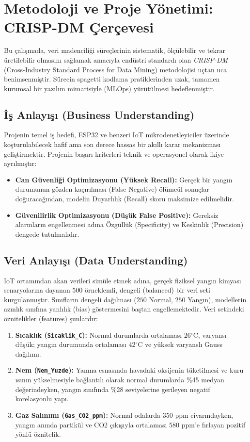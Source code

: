 \documentclass[12pt,a4paper]{article}
\begin{document}
\section{Metodoloji ve Proje Yönetimi: CRISP-DM Çerçevesi}
Bu çalışmada, veri madenciliği süreçlerinin sistematik, ölçülebilir ve tekrar üretilebilir olmasını sağlamak amacıyla endüstri standardı olan \textit{CRISP-DM} (Cross-Industry Standard Process for Data Mining) metodolojisi uçtan uca benimsenmiştir. Sürecin spagetti kodlama pratiklerinden uzak, tamamen kurumsal bir yazılım mimarisiyle (MLOps) yürütülmesi hedeflenmiştir.

\subsection{İş Anlayışı (Business Understanding)}
Projenin temel iş hedefi, ESP32 ve benzeri IoT mikrodenetleyiciler üzerinde koşturulabilecek hafif ama son derece hassas bir akıllı karar mekanizması geliştirmektir. Projenin başarı kriterleri teknik ve operasyonel olarak ikiye ayrılmıştır:
\begin{itemize}
    \item \textbf{Can Güvenliği Optimizasyonu (Yüksek Recall):} Gerçek bir yangın durumunun gözden kaçırılması (False Negative) ölümcül sonuçlar doğuracağından, modelin Duyarlılık (Recall) skoru maksimize edilmelidir.
    \item \textbf{Güvenilirlik Optimizasyonu (Düşük False Positive):} Gereksiz alarmların engellenmesi adına Özgüllük (Specificity) ve Keskinlik (Precision) dengede tutulmalıdır.
\end{itemize}

\subsection{Veri Anlayışı (Data Understanding)}
IoT ortamından akan verileri simüle etmek adına, gerçek fiziksel yangın kimyası senaryolarına dayanan 500 örneklemli, dengeli (balanced) bir veri seti kurgulanmıştır. Sınıfların dengeli dağılması ($250$ Normal, $250$ Yangın), modellerin azınlık sınıfına yanlılık (bias) göstermesini baştan engellemektedir. Veri setindeki öznitelikler (features) şunlardır:
\begin{enumerate}
    \item \textbf{Sıcaklık (\texttt{Sicaklik\_C}):} Normal durumlarda ortalaması 26$^\circ$C, varyansı düşük; yangın durumunda ortalaması 42$^\circ$C ve yüksek varyanslı Gauss dağılımı.
    \item \textbf{Nem (\texttt{Nem\_Yuzde}):} Yanma esnasında havadaki oksijenin tüketilmesi ve kuru ısının yükselmesiyle bağlantılı olarak normal durumlarda \%45 medyan değerindeyken, yangın sınıfında \%28 seviyelerine gerileyen negatif korelasyonlu yapı.
    \item \textbf{Gaz Salınımı (\texttt{Gas\_CO2\_ppm}):} Normal odalarda 350 ppm civarındayken, yangın anında partikül ve CO2 çıkışıyla ortalaması 580 ppm'e fırlayan pozitif yönlü öznitelik.
\end{enumerate}
\end{document}
